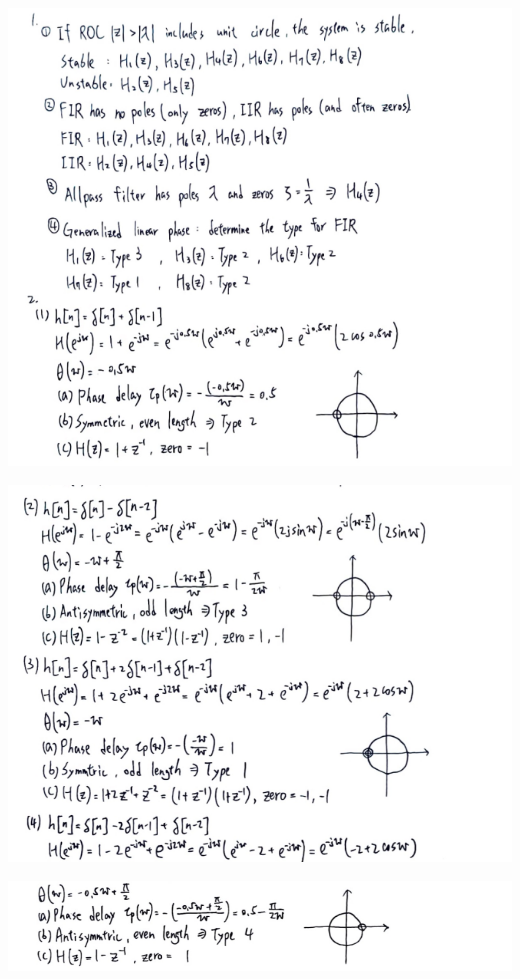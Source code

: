 \documentclass[a4paper]{article}
\begin{document}
	\begin{center}
		\includegraphics[width=1\linewidth]{screenshot126}
	\end{center}
	\begin{center}
		\includegraphics[width=1\linewidth]{screenshot127}
	\end{center}
	\begin{center}
		\includegraphics[width=1\linewidth]{screenshot128}
	\end{center}
\end{document}
